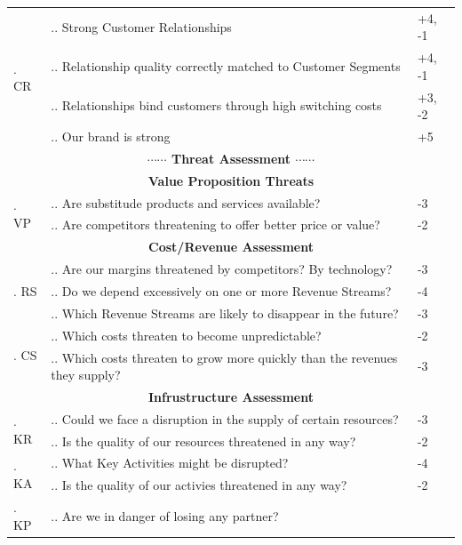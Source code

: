 \documentclass[dvipsnames, svgnames, x11names, 11pt]{article}
\newcounter{secq}
\newcommand{\seccnt}{\stepcounter{secq}\arabic{secq}. }
\newcounter{swotq}[secq]
\newcommand{\swotqcnt}{\stepcounter{swotq}\arabic{secq}.\arabic{swotq}. }
\begin{document}
\begin{latin}
\begin{center}
\begin{longtable}{p{}|p{}|p{}}
\multirow{4}{*}{\seccnt CR}
& \swotqcnt Strong Customer Relationships
& +4, -1\\ \cline{2-3}
& \swotqcnt Relationship quality correctly matched to Customer Segments
& +4, -1\\ \cline{2-3}
& \swotqcnt Relationships bind customers through high switching costs
& +3, -2\\ \cline{2-3}
& \swotqcnt Our brand is strong
& +5\\ \hline
\hline
\hline
\hline
\hline
\multicolumn{3}{c}{\textbf{{\large $\cdots\cdots$ Threat Assessment $\cdots\cdots$}}} \\
\hline
\hline
\hline
\hline
\multicolumn{3}{c}{\textbf{Value Proposition Threats}} \\
\hline
\hline
\multirow{2}{*}{\setcounter{secq}{0} \seccnt VP}
& \swotqcnt Are substitude products and services available?
& -3 \\ \cline{2-3}
& \swotqcnt Are competitors threatening to offer better price or value?
& -2 \\
\hline
\hline
\multicolumn{3}{c}{\textbf{Cost/Revenue Assessment}} \\
\hline
\hline
\multirow{3}{*}{\seccnt RS}
& \swotqcnt Are our margins threatened by competitors? By technology?
& -3 \\ \cline{2-3}
& \swotqcnt Do we depend excessively on one or more Revenue Streams?
& -4 \\ \cline{2-3}
& \swotqcnt Which Revenue Streams are likely  to disappear in the future?
& -3 \\ 
\hline
\multirow{2}{*}{\seccnt CS}
& \swotqcnt Which costs threaten to become unpredictable?
& -2 \\ \cline{2-3}
& \swotqcnt Which costs threaten to grow more quickly than the revenues they supply?
& -3 \\ 
\hline
\hline
\multicolumn{3}{c}{\textbf{Infrustructure Assessment}} \\
\hline
\hline
\multirow{2}{*}{\seccnt KR}
& \swotqcnt Could we face a disruption in the supply of certain resources?
& -3 \\ \cline{2-3}
& \swotqcnt Is the quality of our resources threatened in any way?
& -2 \\ 
\hline
\multirow{2}{*}{\seccnt KA}
& \swotqcnt What Key Activities might be disrupted?
& -4 \\ \cline{2-3}
& \swotqcnt Is the quality of our activies threatened in any way?
& -2 \\ 
\hline
\multirow{3}{*}{\seccnt KP}
& \swotqcnt Are we in danger of losing any partner?

\end{longtable}
\end{center}
\end{latin}
\end{document}
